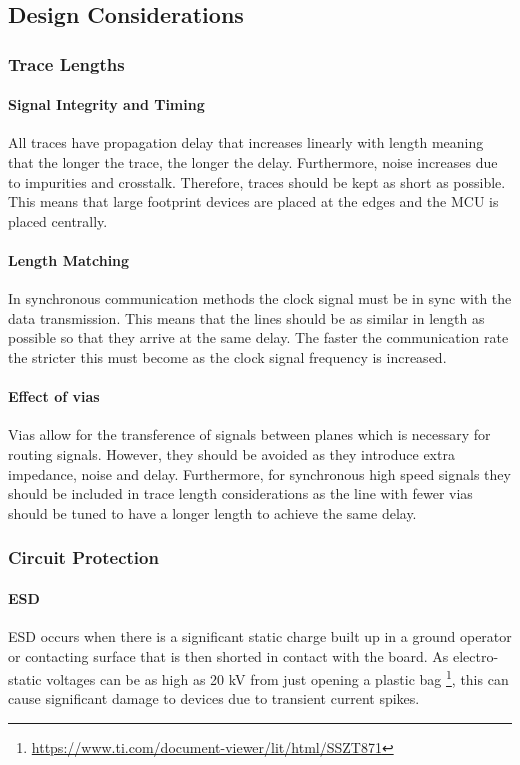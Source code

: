 \subsection{Design Considerations}\label{sub_section:tgt_design_considerations}

\subsubsection{Trace Lengths}\label{sub_sub_section:tgt_trace_lengths}
\paragraph{Signal Integrity and Timing}
All traces have propagation delay that increases linearly with length meaning that the longer the trace, the longer the delay. Furthermore, noise increases due to impurities and crosstalk. Therefore, traces should be kept as short as possible. This means that large footprint devices are placed at the edges and the \gls{MCU} is placed centrally.
\paragraph{Length Matching}
In synchronous communication methods the clock signal must be in sync with the data transmission. This means that the lines should be as similar in length as possible so that they arrive at the same delay. The faster the communication rate the stricter this must become as the clock signal frequency is increased.
\paragraph{Effect of vias}
Vias allow for the transference of signals between planes which is necessary for routing signals. However, they should be avoided as they introduce extra impedance, noise and delay. Furthermore, for synchronous high speed signals they should be included in trace length considerations as the line with fewer vias should be tuned to have a longer length to achieve the same delay.

\subsubsection{Circuit Protection}\label{sub_sub_section:tgt_circuit_protection}
\paragraph{\gls{ESD}}
\gls{ESD} occurs when there is a significant static charge built up in a ground operator or contacting surface that is then shorted in contact with the board. As electro-static voltages can be as high as 20 kV from just opening a plastic bag \footnote{\url{https://www.ti.com/document-viewer/lit/html/SSZT871}}, this can cause significant damage to devices due to transient current spikes.

